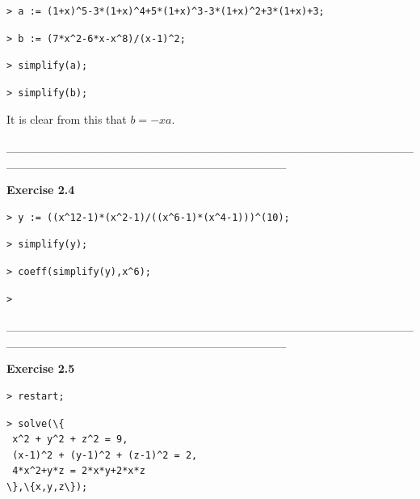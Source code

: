 \documentclass{article}
\begin{document}
\begin{lstlisting}
> a := (1+x)^5-3*(1+x)^4+5*(1+x)^3-3*(1+x)^2+3*(1+x)+3;
\end{lstlisting}
\begin{lstlisting}
> b := (7*x^2-6*x-x^8)/(x-1)^2;
\end{lstlisting}
\begin{lstlisting}
> simplify(a);
\end{lstlisting}
\begin{lstlisting}
> simplify(b);
\end{lstlisting}
\begin{Maple Normal}

\end{Maple Normal}
\begin{Maple Normal}
It is clear from this that 
$b =-x a$.
\end{Maple Normal}
\begin{Maple Normal}
\_\_\_\_\_\_\_\_\_\_\_\_\_\_\_\_\_\_\_\_\_\_\_\_\_\_\_\_\_\_\_\_\_\_\_\_\_\_\_\_\_\_\_\_\_\_\_\_\_\_\_\_\_\_\_\_\_\_\_\_\_\_\_\_\_\_\_\_\_\_\_\_\_\_\_\_\_\_\_\_\_
\end{Maple Normal}
\begin{Maple Heading 2}
\textbf{Exercise 2.4}
\end{Maple Heading 2}
\begin{lstlisting}
> y := ((x^12-1)*(x^2-1)/((x^6-1)*(x^4-1)))^(10);
\end{lstlisting}
\begin{lstlisting}
> simplify(y);
\end{lstlisting}
\begin{lstlisting}
> coeff(simplify(y),x^6);
\end{lstlisting}
\begin{lstlisting}
> 
\end{lstlisting}
\begin{Maple Normal}
\_\_\_\_\_\_\_\_\_\_\_\_\_\_\_\_\_\_\_\_\_\_\_\_\_\_\_\_\_\_\_\_\_\_\_\_\_\_\_\_\_\_\_\_\_\_\_\_\_\_\_\_\_\_\_\_\_\_\_\_\_\_\_\_\_\_\_\_\_\_\_\_\_\_\_\_\_\_\_\_\_
\end{Maple Normal}
\begin{Maple Heading 2}
\textbf{Exercise 2.5}
\end{Maple Heading 2}
\begin{lstlisting}
> restart;
\end{lstlisting}
\begin{lstlisting}
> solve(\{
 x^2 + y^2 + z^2 = 9,
 (x-1)^2 + (y-1)^2 + (z-1)^2 = 2,
 4*x^2+y*z = 2*x*y+2*x*z
\},\{x,y,z\});
\end{lstlisting}
\end{document}
